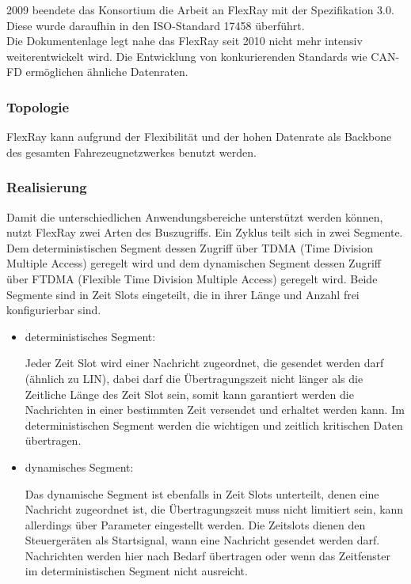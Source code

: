     2009 beendete das Konsortium die Arbeit an FlexRay mit der Spezifikation 3.0. Diese wurde
    daraufhin in den ISO-Standard 17458 überführt.\\
    Die Dokumentenlage legt nahe das FlexRay seit 2010 nicht mehr intensiv weiterentwickelt 
    wird. 
    Die Entwicklung von konkurierenden Standards wie CAN-FD ermöglichen ähnliche Datenraten.
    ~\cite{LA_FR1}
    ~\cite{LA_FR5}
    ~\cite{LA_FR6}
    
    \subsubsection{Topologie}

    FlexRay kann aufgrund der Flexibilität und der hohen Datenrate als Backbone des gesamten
    Fahrezeugnetzwerkes benutzt werden.

    \subsubsection{Realisierung}

    Damit die unterschiedlichen Anwendungsbereiche unterstützt werden können, nutzt FlexRay
    zwei Arten des Buszugriffs.
    Ein Zyklus teilt sich in zwei Segmente. Dem deterministischen Segment dessen Zugriff über
    TDMA (Time Division Multiple Access) geregelt wird und dem dynamischen Segment dessen 
    Zugriff über FTDMA (Flexible Time Division Multiple Access) geregelt wird.
    Beide Segmente sind in Zeit Slots eingeteilt, die in ihrer Länge und Anzahl frei konfigurierbar sind.\\
    \begin{itemize}
    \item{deterministisches Segment:}
    
    Jeder Zeit Slot wird einer Nachricht zugeordnet, die gesendet werden darf (ähnlich zu LIN), 
    dabei darf die Übertragungszeit nicht länger als die Zeitliche Länge des Zeit Slot sein, somit kann
    garantiert werden die Nachrichten in einer bestimmten Zeit versendet und erhaltet werden
    kann. Im deterministischen Segment werden die wichtigen und zeitlich kritischen Daten
    übertragen. \\
    
    \item{dynamisches Segment:}

    Das dynamische Segment ist ebenfalls in Zeit Slots unterteilt, denen eine Nachricht zugeordnet ist,
    die Übertragungszeit muss nicht limitiert sein, kann allerdings über Parameter eingestellt werden. 
    Die Zeitslots dienen den Steuergeräten als Startsignal, wann eine Nachricht gesendet werden darf. 
    Nachrichten werden hier nach Bedarf übertragen oder wenn das Zeitfenster im deterministischen Segment 
    nicht ausreicht.\\
    \end{itemize}

